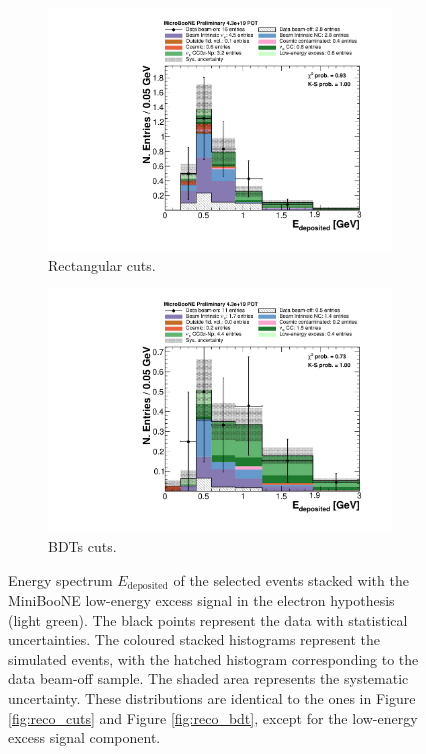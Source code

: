 \begin{figure}[htbp]
  \begin{center}
    \begin{subfigure}{0.48\textwidth}
      \includegraphics[width=\linewidth]{figures/cuts_lee.pdf}
      \caption{Rectangular cuts.} 
    \end{subfigure}\hfill
    \begin{subfigure}{0.48\textwidth}
      \includegraphics[width=\linewidth]{figures/bdt_lee.pdf}
      \caption{BDTs cuts.}  
    \end{subfigure}
    \caption{Energy spectrum $E_{\mathrm{deposited}}$ of the selected events stacked with the MiniBooNE low-energy excess signal in the electron hypothesis (light green). The black points represent the data with statistical uncertainties. The coloured stacked histograms represent the simulated events, with the hatched histogram corresponding to the data beam-off sample. The shaded area represents the systematic uncertainty. These distributions are identical to the ones in Figure \ref{fig:reco_cuts} and Figure \ref{fig:reco_bdt}, except for the low-energy excess signal component.} \label{fig:lee_after}
	\end{center}
\end{figure}


